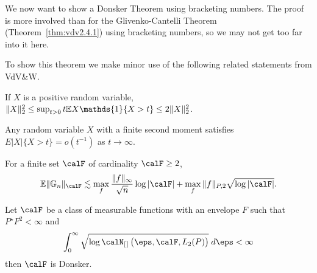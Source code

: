 
We now want to show a Donsker Theorem using bracketing numbers. The proof is more involved than for the Glivenko-Cantelli Theorem (Theorem~\ref{thm:vdv2.4.1}) using bracketing numbers, so we may not get too far into it here. 

To show this theorem we make minor use of the following related statements from VdV\&W.
\begin{lemma}
	\label{lemma:vdv2.5.5}
	If \(X\) is a positive random variable, \(\|X\|_2^2\leq \sup_{t>0}t\E X\mathds{1}\{X > t\} \leq  2 \|X\|_2^2\).
\end{lemma}

\begin{lemma}
	\label{lemma:vdv2.5.6}
	Any random variable \(X\) with a finite second moment satisfies \(E|X|\{X > t\}=o(t^{-1})\) as \(t\to\infty\).
\end{lemma}
\begin{lemma}
	\label{eq:vdv2.5.5}
	For a finite set \(\calF\) of cardinality \(\calF\geq 2\),
	\[
		\E\|\mathbb{G}_n\|_\calF \lesssim \max_f \frac{\|f\|_\infty}{\sqrt{n}}\log |\calF| + \max_f \|f\|_{P,2}\sqrt{\log|\calF|} 
	.\] 
\end{lemma}
\begin{theorem}
	\label{thm:donsker-bracketing}
	Let \(\calF\) be a class of measurable functions with an envelope \(F\) such that \(P^\star F^2 < \infty\) and
	\begin{equation}
		\label{eq:donsker-bracketing-condition}
		\int_{0}^{\infty} \sqrt{\log\calN_{[\hspace{0.1em}]}\left(\eps,\calF,L_2(P)\right)}\;d\eps <\infty
	\end{equation}
	then \(\calF\) is Donsker.
\end{theorem}
